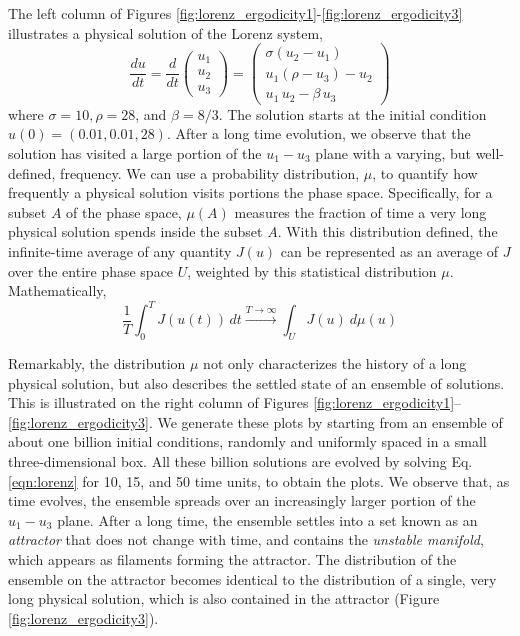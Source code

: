 The left column of Figures \ref{fig:lorenz_ergodicity1}-\ref{fig:lorenz_ergodicity3}
illustrates a physical solution of the Lorenz system,
\begin{equation}
\label{eqn:lorenz}
\frac{du}{dt} =
    \frac{d}{dt}\begin{pmatrix}u_1\\u_2\\u_3\end{pmatrix} =
    \begin{pmatrix}
        \sigma (u_2-u_1) \\
        u_1(\rho -u_3) - u_2 \\
        u_1\,u_2 - \beta\,u_3
\end{pmatrix}
\end{equation}
where $\sigma=10,\rho=28$, and $\beta=8/3$.  The solution starts at the initial
condition $u(0)=(0.01, 0.01, 28)$.  After a long time evolution, we observe that
the solution has visited a large portion of the $u_1-u_3$ plane with a varying, but well-defined, frequency.  We can use a probability distribution, $\mu$, to quantify
how frequently a physical solution visits portions the phase space.
Specifically, for a subset $A$ of the phase space, $\mu(A)$ measures the
fraction of time a very long physical solution spends inside the subset $A$.
With this distribution defined, the infinite-time average of any quantity $J(u)$ can be represented as an average of $J$ over the entire phase space $U$, weighted
by this statistical distribution $\mu$.  Mathematically,
\begin{equation}
    \frac1T \int_0^T J(u(t))\,dt \xrightarrow{T\to\infty}
    \int_U J(u)\: d\mu(u)
\end{equation}

Remarkably, the distribution $\mu$ not only characterizes the history of
a long physical solution, but also describes the settled state of
an ensemble of solutions.
This is illustrated on the right column of Figures \ref{fig:lorenz_ergodicity1}--\ref{fig:lorenz_ergodicity3}.
We generate these plots by starting from an ensemble of about one billion initial
conditions, randomly and uniformly spaced in a small three-dimensional box.  All these billion solutions are evolved by solving Eq. \ref{eqn:lorenz} for 10, 15, and 50 time units, to obtain the plots. 
We observe that, as time evolves, the ensemble spreads over an increasingly
larger portion of the $u_1-u_3$ plane. After a long time, the ensemble settles into a set known as an \emph{attractor} that does not change with time, and contains the \emph{unstable manifold}, which appears as filaments forming the attractor. The distribution of the ensemble on the attractor becomes identical to the distribution of a single, very long physical
solution, which is also contained in the attractor (Figure \ref{fig:lorenz_ergodicity3}).

